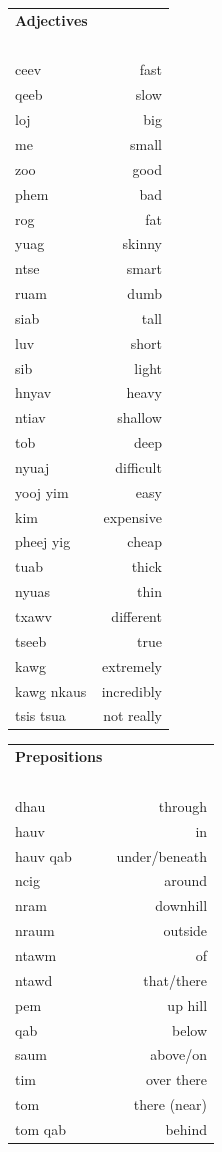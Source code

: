 \documentclass{article}
\begin{document}
\clearpage

\begin{multicols}{2}
[
\section*{}
]

\begin{tabular}{l r}
\textbf{Adjectives} \\
~\\
ceev &fast\\
qeeb &slow\\
loj &big\\
me &small\\
zoo &good\\
phem &bad\\
rog &fat\\
yuag &skinny\\
ntse &smart\\
ruam &dumb\\
siab &tall\\
luv &short\\
sib &light\\
hnyav &heavy\\
ntiav &shallow\\
tob &deep\\
nyuaj &difficult\\
yooj yim &easy\\
kim &expensive\\
pheej yig &cheap\\
tuab &thick\\
nyuas &thin\\
txawv &different\\
tseeb &true\\
kawg &extremely\\
kawg nkaus &incredibly\\
tsis tsua &not really\\
\end{tabular}

\begin{tabular}{l r}
\textbf{Prepositions} \\
~\\
dhau &through\\
hauv &in\\
hauv qab &under/beneath\\
ncig &around\\
nram &downhill\\
nraum &outside\\
ntawm &of\\
ntawd &that/there\\
pem &up hill\\
qab &below\\
saum &above/on\\
tim &over there\\
tom &there (near)\\
tom qab &behind\\
\end{tabular}


\end{multicols}
\end{document}
